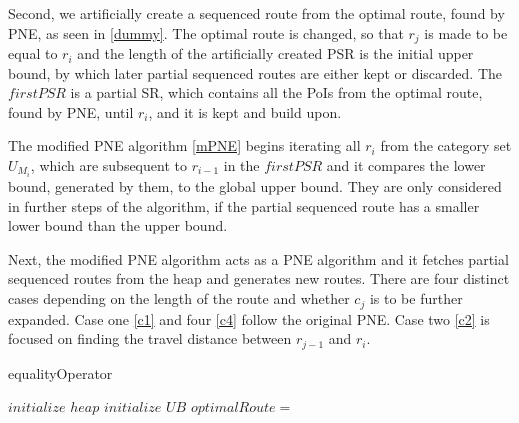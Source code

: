Second, we artificially create a sequenced route from the optimal route, found by PNE, as seen in \ref{dummy}. The optimal route is changed, so that $r_j$ is made to be equal to $r_i$ and the length of the artificially created PSR is the initial upper bound, by which later partial sequenced routes are either kept or discarded. The $firstPSR$ is a partial SR, which contains all the PoIs from the optimal route, found by PNE, until $r_i$, and it is kept and build upon.

The modified PNE algorithm \ref{mPNE} begins iterating all $r_i$ from the category set $U_{M_i}$, which are subsequent to $r_{i-1}$ in the $firstPSR$ and it compares the lower bound, generated by them, to the global upper bound. They are only considered in further steps of the algorithm, if the partial sequenced route has a smaller lower bound than the upper bound.

Next, the modified PNE algorithm acts as a PNE algorithm and it fetches partial sequenced routes from the heap and generates new routes. There are four distinct cases depending on the length of the route and whether $c_j$ is to be further expanded. Case one \ref{c1} and four \ref{c4} follow the original PNE. Case two \ref{c2} is focused on finding the travel distance between $r_{j-1}$ and $r_i$.




\begin{algorithm}
	\label{equality}
	\caption{equalityOperator}
	
	\BlankLine
	
	$initialize$ $heap$\; 
	$initialize$ $UB$\; 
	$optimalRoute =$\;
	{
		\dummySR{}\;
		\modifiedPNE{}\;
	}
\end{algorithm}

